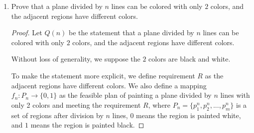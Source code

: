 \documentclass[12pt,a4paper]{article}
\theoremstyle{definition}
\begin{document}
\begin{enumerate}
\begin{proof}
        \textbf{\color{blue}Induction Hypothesis} For $k \geq 1$ and $1 \leq n \leq k$, $P(n)$ is true.

        \textbf{\color{blue}Proof of Induction Step}. Let us prove $P(k+1)$. According to the definition of prime number, it cannot be formed by multiplying two smaller number. So if a number greater than $1$ does not have any smaller prime divisor, it is bound to be a prime number. Notice that $p_{k+1} \leq \prod_{i=1}^k p_i + 1 \stackrel{\Delta}{=} m$, because if $p_{k+1} \geq m$, then $m$ must be the $(k+1)$-th prime number, since $m$ does not have any smaller prime divisor, that is, $\forall 1 \leq i \leq k, p_i \nmid m$. And that is because $\forall 1 \leq i \leq k, p_i \mid (m - 1)$ and $(m - 1, m) = 1$ where $(x, y)$ denotes the greatest common divisor between $x$ and $y$. As a result,

        \begin{equation}\label{eq3-1}
            p_{k+1} \leq 1 + \prod_{i=1}^k p_i < 1 + \prod_{i=1}^k 2^{2^i} = 1 + 2 ^ {\sum_{i=1}^k 2^i} = 1 + 2^{2^{k+1} - 2} = 1 + \frac{1}{4} \cdot 2^{2^{k+1}} < 2^{2^{k+1}}
        \end{equation}

        According to Equation   \eqref{eq3-1}, we prove $P(k+1)$ is true.

        \textbf{\color{blue}Conclusion}. $P(n)$ is true for every $n \in \mathbb{N}_+$.
    \end{proof}

    \item
    Prove that a plane divided by $n$ lines can be colored with only $2$ colors, and the adjacent regions have different colors.
    \begin{proof}
        Let $Q(n)$ be the statement that a plane divided by $n$ lines can be colored with only $2$ colors, and the adjacent regions have different colors.

        Without loss of generality, we suppose the $2$ colors are black and white.

        To make the statement more explicit, we define requirement $R$ as the adjacent regions have different colors. We also define a mapping $f_n: P_n \rightarrow \{0, 1\}$ as the feasible plan of painting a plane divided by $n$ lines with only 2 colors and meeting the requirement $R$, where $P_n = \{p_1^n, p_2^n, ..., p_m^n\}$ is a set of regions after division by $n$ lines, $0$ means the region is painted white, and $1$ means the region is painted black.


\end{proof}
\end{enumerate}
\end{document}
